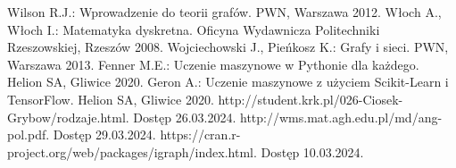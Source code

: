 
\begin{thebibliography}{4}
 Wilson R.J.: Wprowadzenie do teorii grafów. PWN, Warszawa 2012.
 Włoch A., Włoch I.: Matematyka dyskretna. Oficyna Wydawnicza Politechniki Rzeszowskiej, Rzeszów 2008.
 Wojciechowski J., Pieńkosz K.: Grafy i sieci. PWN, Warszawa 2013.
 Fenner M.E.: Uczenie maszynowe w Pythonie dla każdego. Helion SA, Gliwice 2020.
 Geron A.: Uczenie maszynowe z użyciem Scikit-Learn i TensorFlow. Helion SA, Gliwice 2020.
 http://student.krk.pl/026-Ciosek-Grybow/rodzaje.html. Dostęp 26.03.2024.
 http://wms.mat.agh.edu.pl/\texttildelow md/ang-pol.pdf. Dostęp 29.03.2024. 
 https://cran.r-project.org/web/packages/igraph/index.html. Dostęp 10.03.2024.
\end{thebibliography}